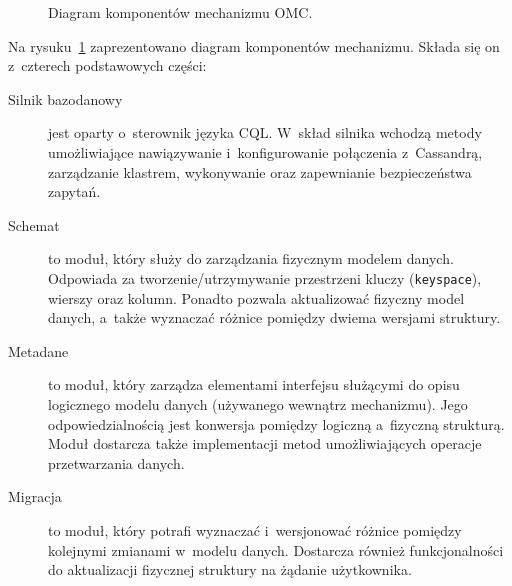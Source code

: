 \begin{figure}[ht!]
	\centering
	\caption{Diagram komponentów mechanizmu OMC.}
	\label{fig:omc_components}
\end{figure}

Na rysuku~\ref{fig:omc_components} zaprezentowano diagram komponentów mechanizmu. Składa się on z~czterech podstawowych części:

\begin{description}
	\item[Silnik bazodanowy] jest oparty o~sterownik języka CQL. W~skład silnika wchodzą metody umożliwiające nawiązywanie i~konfigurowanie połączenia z~Cassandrą, zarządzanie klastrem, wykonywanie oraz zapewnianie bezpieczeństwa zapytań.
	\item[Schemat] to moduł, który służy do zarządzania fizycznym modelem danych. Odpowiada za tworzenie/utrzymywanie przestrzeni kluczy (\verb+keyspace+), wierszy oraz kolumn. Ponadto pozwala aktualizować fizyczny model danych, a~także wyznaczać różnice pomiędzy dwiema wersjami struktury.
	\item[Metadane] to moduł, który zarządza elementami interfejsu służącymi do opisu logicznego modelu danych (używanego wewnątrz mechanizmu). Jego odpowiedzialnością jest konwersja pomiędzy logiczną a~fizyczną strukturą. Moduł dostarcza także implementacji metod umożliwiających operacje przetwarzania danych.
	\item[Migracja] to moduł, który potrafi wyznaczać i~wersjonować różnice pomiędzy kolejnymi zmianami w~modelu danych. Dostarcza również funkcjonalności do aktualizacji fizycznej struktury na żądanie użytkownika.
\end{description}

